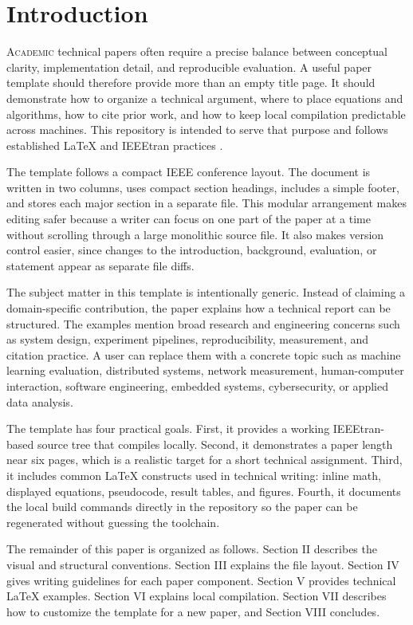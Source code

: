 \section{Introduction}

\lettrine[lines=3,lhang=0.08,loversize=0.15,findent=0.5em,nindent=0em]{A}{cademic} technical papers often require a precise balance between conceptual clarity, implementation detail, and reproducible evaluation. A useful paper template should therefore provide more than an empty title page. It should demonstrate how to organize a technical argument, where to place equations and algorithms, how to cite prior work, and how to keep local compilation predictable across machines. This repository is intended to serve that purpose and follows established LaTeX and IEEEtran practices \cite{lamport1994,ieeetranhowto}.

The template follows a compact IEEE conference layout. The document is written in two columns, uses compact section headings, includes a simple footer, and stores each major section in a separate file. This modular arrangement makes editing safer because a writer can focus on one part of the paper at a time without scrolling through a large monolithic source file. It also makes version control easier, since changes to the introduction, background, evaluation, or statement appear as separate file diffs.

The subject matter in this template is intentionally generic. Instead of claiming a domain-specific contribution, the paper explains how a technical report can be structured. The examples mention broad research and engineering concerns such as system design, experiment pipelines, reproducibility, measurement, and citation practice. A user can replace them with a concrete topic such as machine learning evaluation, distributed systems, network measurement, human-computer interaction, software engineering, embedded systems, cybersecurity, or applied data analysis.

The template has four practical goals. First, it provides a working IEEEtran-based source tree that compiles locally. Second, it demonstrates a paper length near six pages, which is a realistic target for a short technical assignment. Third, it includes common LaTeX constructs used in technical writing: inline math, displayed equations, pseudocode, result tables, and figures. Fourth, it documents the local build commands directly in the repository so the paper can be regenerated without guessing the toolchain.

The remainder of this paper is organized as follows. Section II describes the visual and structural conventions. Section III explains the file layout. Section IV gives writing guidelines for each paper component. Section V provides technical LaTeX examples. Section VI explains local compilation. Section VII describes how to customize the template for a new paper, and Section VIII concludes.
